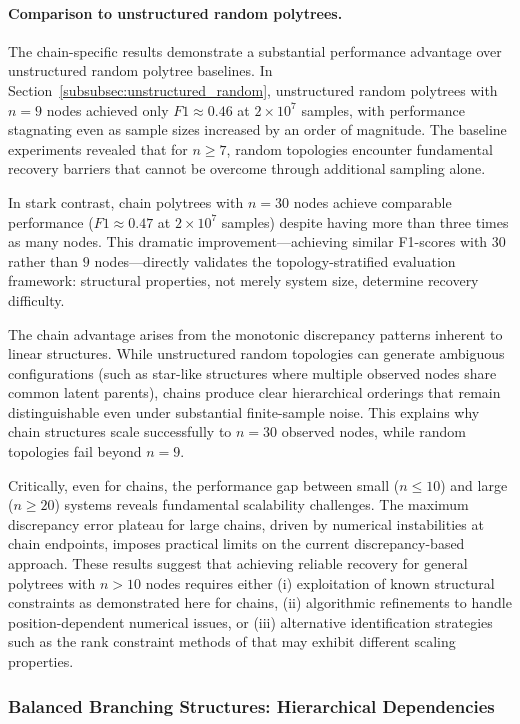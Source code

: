\documentclass[11pt,a4paper]{article}
\numberwithin{equation}{section}
\begin{document}
\paragraph{Comparison to unstructured random polytrees.} The chain-specific results demonstrate a substantial performance advantage over unstructured random polytree baselines. In Section~\ref{subsubsec:unstructured_random}, unstructured random polytrees with $n=9$ nodes achieved only $F1 \approx 0.46$ at $2 \times 10^7$ samples, with performance stagnating even as sample sizes increased by an order of magnitude. The baseline experiments revealed that for $n \geq 7$, random topologies encounter fundamental recovery barriers that cannot be overcome through additional sampling alone.

In stark contrast, chain polytrees with $n=30$ nodes achieve comparable performance ($F1 \approx 0.47$ at $2 \times 10^7$ samples) despite having more than three times as many nodes. This dramatic improvement---achieving similar F1-scores with $30$ rather than $9$ nodes---directly validates the topology-stratified evaluation framework: structural properties, not merely system size, determine recovery difficulty.

The chain advantage arises from the monotonic discrepancy patterns inherent to linear structures. While unstructured random topologies can generate ambiguous configurations (such as star-like structures where multiple observed nodes share common latent parents), chains produce clear hierarchical orderings that remain distinguishable even under substantial finite-sample noise. This explains why chain structures scale successfully to $n=30$ observed nodes, while random topologies fail beyond $n=9$.

Critically, even for chains, the performance gap between small ($n \leq 10$) and large ($n \geq 20$) systems reveals fundamental scalability challenges. The maximum discrepancy error plateau for large chains, driven by numerical instabilities at chain endpoints, imposes practical limits on the current discrepancy-based approach. These results suggest that achieving reliable recovery for general polytrees with $n > 10$ nodes requires either (i) exploitation of known structural constraints as demonstrated here for chains, (ii) algorithmic refinements to handle position-dependent numerical issues, or (iii) alternative identification strategies such as the rank constraint methods of \citet{cai:etal:2024:rank} that may exhibit different scaling properties.


\subsubsection{Balanced Branching Structures: Hierarchical Dependencies}
\end{document}
